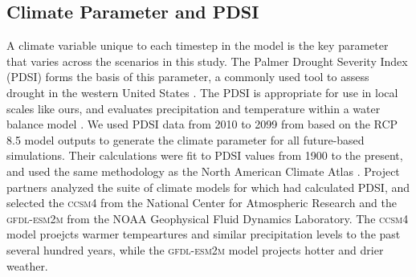 \documentclass[12pt]{article}
\begin{document}
\begin{spacing}{1}


\subsection{Climate Parameter and PDSI}
A climate variable unique to each timestep in the model is the key parameter that varies across the scenarios in this study. The Palmer Drought Severity Index (PDSI) forms the basis of this parameter, a commonly used tool to assess drought in the western United States \citep{Cook2004}. The PDSI is appropriate for use in local scales like ours, and evaluates precipitation and temperature within a water balance model \citep{HeimJr2002}. We used PDSI data from 2010 to 2099 from \citet{Cook2014} based on the RCP 8.5 model outputs to generate the climate parameter for all future-based simulations. Their calculations were fit to PDSI values from 1900 to the present, and used the same methodology as the North American Climate Atlas \citep{Cook2004}. Project partners analyzed the suite of climate models for which \citet{Cook2014} had calculated PDSI, and selected the \textsc{ccsm4} from the National Center for Atmospheric Research and the \textsc{gfdl-esm2m} from the NOAA Geophysical Fluid Dynamics Laboratory. The \textsc{ccsm4} model proejcts warmer tempeartures and similar precipitation levels to the past several hundred years, while the \textsc{gfdl-esm2m} model projects hotter and drier weather. 


\end{spacing}
\end{document}
